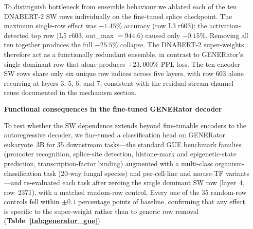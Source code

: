 \documentclass[11pt]{article}
\begin{document}
To distinguish bottleneck from ensemble behaviour we ablated each of
the ten DNABERT-2 SW rows individually on the fine-tuned splice
checkpoint. The maximum single-row effect was $-1.45\%$ accuracy
(row L3 r603); the activation-detected top row (L5 r603,
out\_max $= 944.6$) caused only $-0.15\%$. Removing all ten together
produces the full $-25.5\%$ collapse. The DNABERT-2 super-weights
therefore act as a functionally redundant ensemble, in contrast to
GENERator's single dominant row that alone produces $+23{,}000\%$
PPL loss. The ten encoder SW rows share only six unique row indices
across five layers, with row 603 alone recurring at layers 3, 5, 6,
and 7, consistent with the residual-stream channel reuse documented
in the mechanism section.

\medskip
\noindent\textbf{Functional consequences in the fine-tuned GENERator decoder}

To test whether the SW dependence extends beyond fine-tunable
encoders to the autoregressive decoder, we fine-tuned a
classification head on GENERator eukaryote~3B for 35 downstream
tasks---the standard GUE benchmark families (promoter recognition,
splice-site detection, histone-mark and epigenetic-state
prediction, transcription-factor binding) augmented with a
multi-class organism-classification task (20-way fungal
species) and per-cell-line and mouse-TF variants---and re-evaluated
each task after zeroing the single dominant SW row (layer~4,
row~2371), with a matched random-row control. Every one of the 35
random-row controls fell within $\pm 0.1$ percentage points of
baseline, confirming that any effect is specific to the
super-weight rather than to generic row removal
(\textbf{Table~\ref{tab:generator_gue}}).
\end{document}
